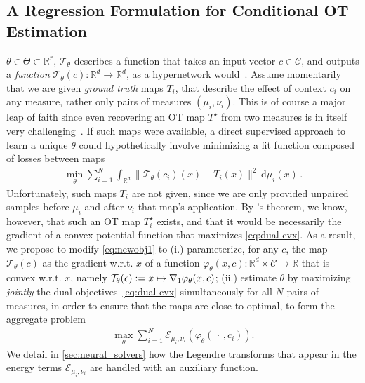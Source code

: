\subsection{A Regression Formulation for Conditional OT Estimation}
 $\theta\in\Theta\subset\mathbb{R}^r$, $\mathcal{T}_\theta$ describes a function that takes an input vector $c\in\mathcal{C}$, and outputs a \textit{function} $\mathcal{T}_\theta(c):\mathbb{R}^d\rightarrow\mathbb{R}^d$, as a hypernetwork would~\citep{ha2016hypernetworks}. Assume momentarily that we are given \textit{ground truth} maps $T_i$, that describe the effect of context $c_i$ on any measure, rather only pairs of measures $(\mu_i,\nu_i)$. This is of course a major leap of faith since even recovering an OT map $T^\star$ from two measures is in itself very challenging~\citep{hutter2021minimax,rigollet2022sample,pooladian2021entropic}. If such maps were available, a direct supervised approach to learn a unique $\theta$ could hypothetically involve minimizing a fit function composed of losses between maps
\begin{align}\label{eq:newobj1}
\min_\theta \sum_{i=1}^N \int_{\mathbb{R}^d} \|\mathcal{T}_{\theta}(c_i)(x) - T_i(x)\|^2\, \mathrm{d}\mu_i(x)\,.
\end{align}
Unfortunately, such maps $T_i$ are not given, since we are only provided unpaired samples before $\mu_i$ and after $\nu_i$ that map's application.
By \citeauthor{brenier1987decomposition}'s theorem, we know, however, that such an OT map $T^\star_i$ exists, and that it would be necessarily the gradient of a convex potential function that maximizes \eqref{eq:dual-cvx}. As a result, we propose to modify \eqref{eq:newobj1} to (i.) parameterize, for any $c$, the map $\mathcal{T}_\theta(c)$ as the gradient w.r.t. $x$ of a function $\varphi_\theta(x,c):\mathbb{R}^d\times \mathcal{C}\rightarrow \mathbb{R}$ that is convex w.r.t. $x$, namely $\mathcal{T}_\theta(c) := x \mapsto \nabla_1 \varphi_\theta(x,c)$; (ii.) estimate $\theta$ by maximizing \textit{jointly} the dual objectives~\eqref{eq:dual-cvx} simultaneously for all $N$ pairs of measures, in order to ensure that the maps are close to optimal, to form the aggregate problem
\begin{align}\label{eq:supdual} 
\textstyle \max_\theta \sum_{i=1}^N \mathcal{E}_{\mu_i,\nu_i}(\varphi_{\theta}(\,\cdot\,, c_i)).
\end{align}
We detail in \cref{sec:neural_solvers} how the Legendre transforms that appear in the energy terms $\mathcal{E}_{\mu_i,\nu_i}$ are handled with an auxiliary function.

